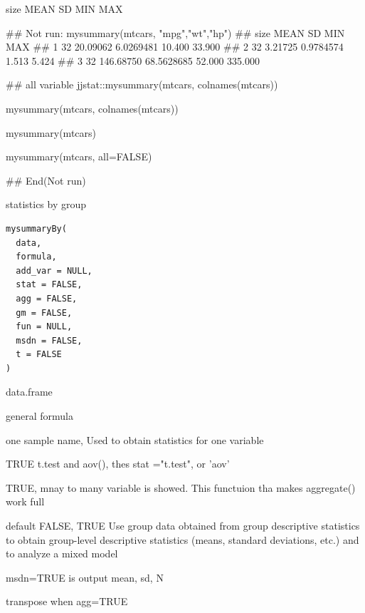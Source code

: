 \documentclass[a4paper]{book}
\begin{document}
%
\begin{Value}
size   MEAN    SD  MIN  MAX
\end{Value}
%
\begin{Examples}
\begin{ExampleCode}
## Not run: 
mysummary(mtcars, "mpg","wt","hp")
## size      MEAN         SD    MIN     MAX
## 1   32  20.09062  6.0269481 10.400  33.900
## 2   32   3.21725  0.9784574  1.513   5.424
## 3   32 146.68750 68.5628685 52.000 335.000

## all variable
 jjstat::mysummary(mtcars, colnames(mtcars))

mysummary(mtcars, colnames(mtcars))

mysummary(mtcars)

mysummary(mtcars, all=FALSE)


## End(Not run)
\end{ExampleCode}
\end{Examples}
%
\begin{Description}
statistics by group
\end{Description}
%
\begin{Usage}
\begin{verbatim}
mysummaryBy(
  data,
  formula,
  add_var = NULL,
  stat = FALSE,
  agg = FALSE,
  gm = FALSE,
  fun = NULL,
  msdn = FALSE,
  t = FALSE
)
\end{verbatim}
\end{Usage}
%
\begin{Arguments}
\begin{ldescription}
\item[\code{data}] data.frame

\item[\code{formula}] general formula

\item[\code{add\_var}] one sample name, Used to obtain statistics for one variable

\item[\code{stat}] TRUE t.test and aov(), thes stat ="t.test", or 'aov'

\item[\code{agg}] TRUE, mnay to many variable is showed. This functuion tha makes aggregate() work full

\item[\code{gm}] default FALSE, TRUE Use group data obtained from group descriptive statistics to obtain group-level descriptive statistics (means, standard deviations, etc.) and to analyze a mixed model

\item[\code{msdn}] msdn=TRUE is output mean, sd, N

\item[\code{t}] transpose  when agg=TRUE
\end{ldescription}
\end{Arguments}
\end{document}
